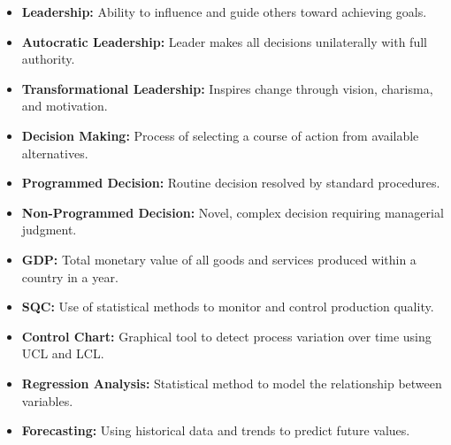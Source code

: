 \documentclass[12pt,a4paper]{article}
\begin{document}
\begin{tcolorbox}[defbox, title={\textbf{One-Line Definitions}}]
\begin{itemize}[leftmargin=*, itemsep=2pt, topsep=0pt]
  \item \textbf{Leadership:} Ability to influence and guide others toward achieving goals.
  \item \textbf{Autocratic Leadership:} Leader makes all decisions unilaterally with full authority.
  \item \textbf{Transformational Leadership:} Inspires change through vision, charisma, and motivation.
  \item \textbf{Decision Making:} Process of selecting a course of action from available alternatives.
  \item \textbf{Programmed Decision:} Routine decision resolved by standard procedures.
  \item \textbf{Non-Programmed Decision:} Novel, complex decision requiring managerial judgment.
  \item \textbf{GDP:} Total monetary value of all goods and services produced within a country in a year.
  \item \textbf{SQC:} Use of statistical methods to monitor and control production quality.
  \item \textbf{Control Chart:} Graphical tool to detect process variation over time using UCL and LCL.
  \item \textbf{Regression Analysis:} Statistical method to model the relationship between variables.
  \item \textbf{Forecasting:} Using historical data and trends to predict future values.
\end{itemize}
\end{tcolorbox}
\end{document}
